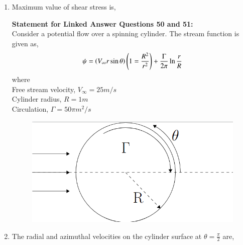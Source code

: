 \documentclass[journal]{IEEEtran}
\begin{document}
\begin{enumerate}
\item Maximum value of shear stress is,
	\begin{enumerate}
\end{enumerate}
\textbf{Statement for Linked Answer Questions 50 and 51:}\\
Consider a potential flow over a spinning cylinder. The stream function is given as,
\begin{align*}
	\psi =\left(V_{\infty}r\sin\theta\right)\left(1=\frac{R^2}{r^2}\right)+\frac{\Gamma}{2\pi}\ln\frac{r}{R}
\end{align*}
where \\
Free stream velocity, $V_{\infty}=25m/s$\\
Cylinder radius, $R=1m$\\
Circulation, $\Gamma =50\pi m^2/s$
\begin{figure}[H]
			\centering
			\includegraphics[scale=0.4]{figs/q50.png}
			\label{stemplot}
		\end{figure}
\item The radial and azimuthal velocities on the cylinder surface at $\theta=\frac{\pi}{2}$ are,
	\begin{enumerate}
\end{enumerate}
\end{enumerate}
\end{document}
